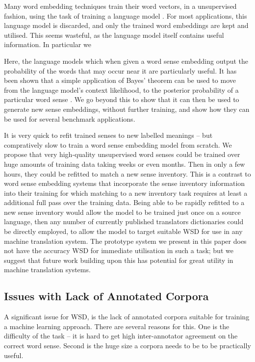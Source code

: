 Many word embedding techniques train their word vectors, in a unsupervised fashion, using the task of training a language model \parencite{NPLM, collobert2008unified, mikolov2013efficient}.
For most applications, this language model is discarded, and only the trained word embeddings are kept and utilised.
This seems wasteful, as the language model itself contains useful information. In particular we


Here, the language models which when given a word sense embedding output the probability of the words that may occur near it are particularly useful. It has been shown that a simple application of Bayes' theorem can be used to move from the language model's context likelihood, to the posterior probability of a particular word sense \cite{tian2014probabilistic,AdaGrams}. We go beyond this to show that it can then be used to generate new sense embeddings, without further training, and show how they can be used for several benchmark applications.



It is very quick to refit trained senses to new labelled meanings -- but compratively slow to train a word sense embedding model from scratch. We propose that very high-quality unsupervised word senses could be trained over huge amounts of training data taking weeks or even months. Then in only a few hours, they could be refitted to match a new sense inventory.  This is a contrast to word sense embedding systems that incorporate the sense inventory information into their training \parencite{Chen2014, iacobacci2015sensembed} for which matching to a new inventory task requires at least a additional full pass over the training data.
Being able to be rapidly refitted to a new sense inventory would allow the model to be trained just once on a source language, then any number of currently published translators dictionaries could be directly employed, to allow the model to target suitable WSD for use in any machine translation system. The prototype system we present in this paper does not have the accuracy WSD for immediate utilisation in such a task; but we suggest that future work building upon this has potential for great utility in machine translation systems.



\subsection{Issues with Lack of Annotated Corpora} \label{corpussize}
A significant issue for WSD, is the lack of annotated corpora suitable for training a machine learning approach.
There are several reasons for this. One is the difficulty of the task -- it is hard to get high inter-annotator agreement on the correct word sense. Second is the huge size a corpora needs to be to be practically useful.


